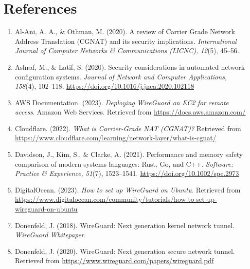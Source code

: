 \documentclass[12pt,a4paper,oneside]{report}
\begin{document}
\clearpage
\chapter*{References}

\begin{enumerate}

\item Al-Ani, A. A., \& Othman, M. (2020). A review of Carrier Grade Network Address Translation (CGNAT) and its security implications. \textit{International Journal of Computer Networks \& Communications (IJCNC), 12}(5), 45--56.

\item Ashraf, M., \& Latif, S. (2020). Security considerations in automated network configuration systems. \textit{Journal of Network and Computer Applications, 158}(4), 102--118. \url{https://doi.org/10.1016/j.jnca.2020.102118}

\item AWS Documentation. (2023). \textit{Deploying WireGuard on EC2 for remote access}. Amazon Web Services. Retrieved from \url{https://docs.aws.amazon.com/}

\item Cloudflare. (2022). \textit{What is Carrier-Grade NAT (CGNAT)?} Retrieved from \url{https://www.cloudflare.com/learning/network-layer/what-is-cgnat/}

\item Davidson, J., Kim, S., \& Clarke, A. (2021). Performance and memory safety comparison of modern systems languages: Rust, Go, and C++. \textit{Software: Practice \& Experience, 51}(7), 1523--1541. \url{https://doi.org/10.1002/spe.2973}

\item DigitalOcean. (2023). \textit{How to set up WireGuard on Ubuntu}. Retrieved from \url{https://www.digitalocean.com/community/tutorials/how-to-set-up-wireguard-on-ubuntu}

\item Donenfeld, J. (2018). WireGuard: Next generation kernel network tunnel. \textit{WireGuard Whitepaper}.

\item Donenfeld, J. (2020). WireGuard: Next generation secure network tunnel. Retrieved from \url{https://www.wireguard.com/papers/wireguard.pdf}


\end{enumerate}
\end{document}
